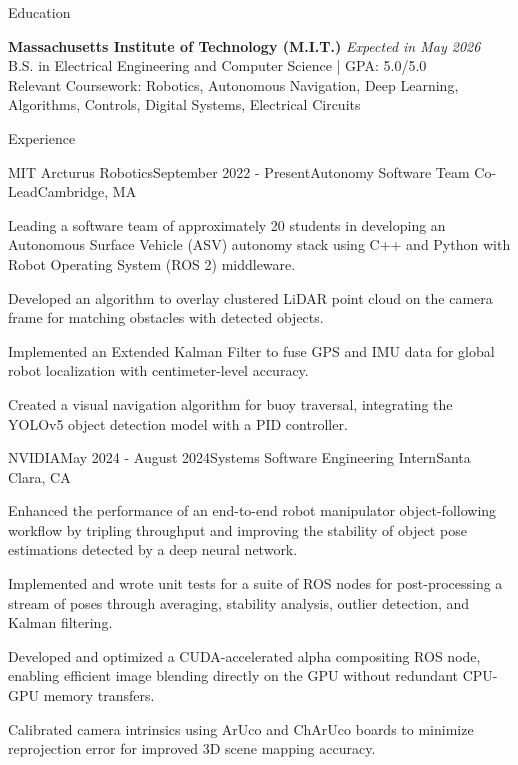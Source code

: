 \documentclass[
	10pt,
]{resume}
\begin{document}
\begin{rSection}{Education}

	\textbf{Massachusetts Institute of Technology (M.I.T.)} \hfill \textit{Expected in May 2026} \\ 
	B.S. in Electrical Engineering and Computer Science | GPA: 5.0/5.0 \\
    Relevant Coursework: Robotics, Autonomous Navigation, Deep Learning, Algorithms, Controls, Digital Systems, Electrical Circuits
\end{rSection}

\begin{rSection}{Experience}

	\begin{rSubsection}{MIT Arcturus Robotics}{September 2022 - Present}{Autonomy Software Team Co-Lead}{Cambridge, MA}
    \item Leading a software team of approximately 20 students in developing an Autonomous Surface Vehicle (ASV) autonomy stack using C++ and Python with Robot Operating System (ROS 2) middleware.
    \item Developed an algorithm to overlay clustered LiDAR point cloud on the camera frame for matching obstacles with detected objects.
    \item Implemented an Extended Kalman Filter to fuse GPS and IMU data for global robot localization with centimeter-level accuracy.
    \item Created a visual navigation algorithm for buoy traversal, integrating the YOLOv5 object detection model with a PID controller.
    \end{rSubsection}

	\begin{rSubsection}{NVIDIA}{May 2024 - August 2024}{Systems Software Engineering Intern}{Santa Clara, CA}
    \item Enhanced the performance of an end-to-end robot manipulator object-following workflow by tripling throughput and improving the stability of object pose estimations detected by a deep neural network.
    \item Implemented and wrote unit tests for a suite of ROS nodes for post-processing a stream of poses through averaging, stability analysis, outlier detection, and Kalman filtering.
    \item Developed and optimized a CUDA-accelerated alpha compositing ROS node, enabling efficient image blending directly on the GPU without redundant CPU-GPU memory transfers.
    \item Calibrated camera intrinsics using ArUco and ChArUco boards to minimize reprojection error for improved 3D scene mapping accuracy.
    \end{rSubsection}


\end{rSection}
\end{document}
